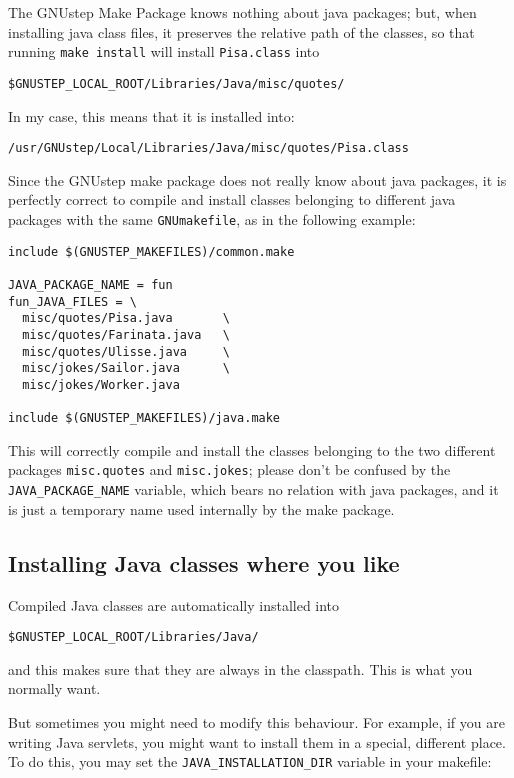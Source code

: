 The GNUstep Make Package knows nothing about java packages; but, when
installing java class files, it preserves the relative path of the
classes, so that running \texttt{make install} will install
\texttt{Pisa.class} into
\begin{verbatim}
$GNUSTEP_LOCAL_ROOT/Libraries/Java/misc/quotes/
\end{verbatim}
In my case, this means that it is installed into:
\begin{verbatim}
/usr/GNUstep/Local/Libraries/Java/misc/quotes/Pisa.class
\end{verbatim}

Since the GNUstep make package does not really know about java
packages, it is perfectly correct to compile and install classes
belonging to different java packages with the same
\texttt{GNUmakefile}, as in the following example:
\begin{verbatim}
include $(GNUSTEP_MAKEFILES)/common.make

JAVA_PACKAGE_NAME = fun
fun_JAVA_FILES = \
  misc/quotes/Pisa.java       \
  misc/quotes/Farinata.java   \
  misc/quotes/Ulisse.java     \
  misc/jokes/Sailor.java      \
  misc/jokes/Worker.java

include $(GNUSTEP_MAKEFILES)/java.make
\end{verbatim}

This will correctly compile and install the classes belonging to the
two different packages \texttt{misc.quotes} and \texttt{misc.jokes};
please don't be confused by the \texttt{JAVA\_PACKAGE\_NAME} variable,
which bears no relation with java packages, and it is just a temporary
name used internally by the make package.

\subsection{Installing Java classes where you like}

Compiled Java classes are automatically installed into
\begin{verbatim}
$GNUSTEP_LOCAL_ROOT/Libraries/Java/
\end{verbatim}
and this makes sure that they are always in the classpath.  This is
what you normally want.

But sometimes you might need to modify this behaviour.  For example,
if you are writing Java servlets, you might want to install them in a
special, different place.  To do this, you may set the
\texttt{JAVA\_INSTALLATION\_DIR} variable in your makefile:

